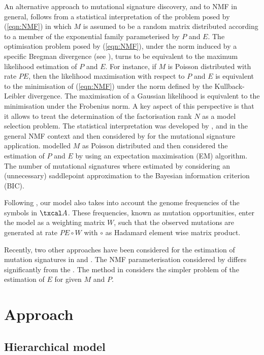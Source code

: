 \documentclass{bioinfo}
\begin{document}
An alternative approach to mutational signature discovery, and to NMF
in general, follows from a statistical interpretation of the problem
posed by (\ref{eqn:NMF}) in which $M$ is assumed to be a random matrix
distributed according to a member of the exponential family
parameterised by $P$ and $E$. The optimisation problem posed by
(\ref{eqn:NMF}), under the norm induced by a specific Bregman
divergence (see \citealp{BMD}), turns to be equivalent to the maximum
likelihood estimation of $P$ and $E$.  For instance, if $M$ is Poisson
distributed with rate $PE$, then the likelihood maximisation with
respect to $P$ and $E$ is equivalent to the minimisation of
(\ref{eqn:NMF}) under the norm defined by the Kullback-Leibler
divergence. The maximisation of a Gaussian likelihood is equivalent to
the minimisation under the Frobenius norm. A key aspect of this
perspective is that it allows to treat the determination of the
factorisation rank $N$ as a model selection problem. The statistical
interpretation was developed by \cite{C}, \cite{FC} and \cite{SWK} in
the general NMF context and then considered by \cite{FICMV} for the
mutational signature application. \cite{FICMV} modelled $M$ as Poisson
distributed and then considered the estimation of $P$ and $E$ by using
an expectation maximisation (EM) algorithm. The number of mutational
signatures where estimated by considering an (unnecessary) saddlepoint
approximation to the Bayesian information criterion
(BIC). 


Following \cite{FICMV}, our model also takes into account the genome
frequencies of the symbols in $\txcal A$.  These frequencies, known as
mutation opportunities, enter the model as a weighting matrix $W$,
such  that the observed mutations are generated at rate $PE\circ W$
with $\circ$ as  Hadamard element wise matrix product.


Recently, two other approaches have been considered for the estimation
of mutation signatures in \cite{STMS} and \cite{RMHTS}. The NMF
parameterisation considered by \cite{STMS} differs significantly from
the . The method in \cite{RMHTS} considers the simpler problem of the
estimation of $E$ for given $M$ and $P$.

\section{Approach}
\subsection{Hierarchical model}
\end{document}
